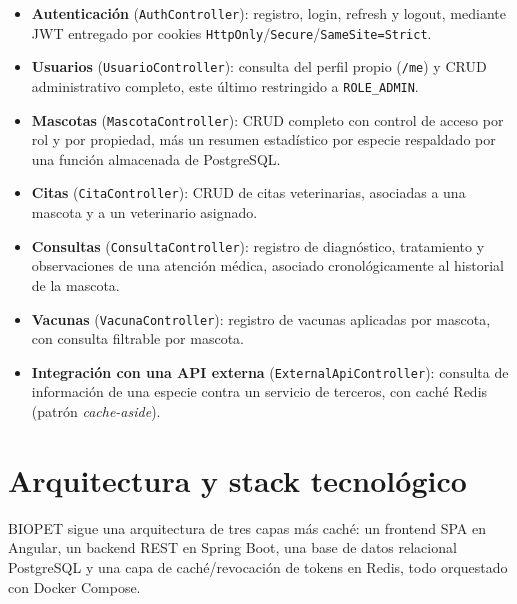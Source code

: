 \begin{itemize}[nosep]
  \item \textbf{Autenticaci\'on} (\texttt{AuthController}): registro,
    login, refresh y logout, mediante JWT entregado por cookies
    \texttt{HttpOnly}/\texttt{Secure}/\texttt{SameSite=Strict}.
  \item \textbf{Usuarios} (\texttt{UsuarioController}): consulta del
    perfil propio (\texttt{/me}) y CRUD administrativo completo, este
    \'ultimo restringido a \texttt{ROLE\_ADMIN}.
  \item \textbf{Mascotas} (\texttt{MascotaController}): CRUD completo con
    control de acceso por rol y por propiedad, m\'as un resumen
    estad\'istico por especie respaldado por una funci\'on almacenada de
    PostgreSQL.
  \item \textbf{Citas} (\texttt{CitaController}): CRUD de citas
    veterinarias, asociadas a una mascota y a un veterinario asignado.
  \item \textbf{Consultas} (\texttt{ConsultaController}): registro de
    diagn\'ostico, tratamiento y observaciones de una atenci\'on m\'edica,
    asociado cronol\'ogicamente al historial de la mascota.
  \item \textbf{Vacunas} (\texttt{VacunaController}): registro de vacunas
    aplicadas por mascota, con consulta filtrable por mascota.
  \item \textbf{Integraci\'on con una API externa}
    (\texttt{ExternalApiController}): consulta de informaci\'on de una
    especie contra un servicio de terceros, con cach\'e Redis
    (patr\'on \emph{cache-aside}).
\end{itemize}

\section{Arquitectura y stack tecnol\'ogico}
\label{sec:arquitectura-stack}

BIOPET sigue una arquitectura de tres capas m\'as cach\'e: un frontend SPA
en Angular, un backend REST en Spring Boot, una base de datos relacional
PostgreSQL y una capa de cach\'e/revocaci\'on de tokens en Redis, todo
orquestado con Docker Compose.

